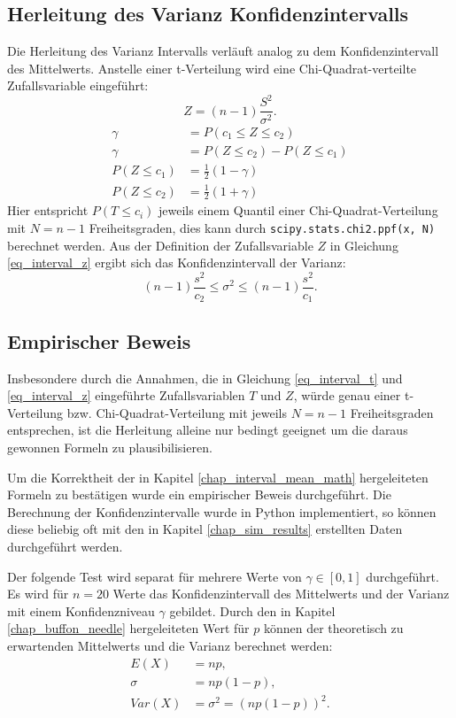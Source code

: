 \documentclass[10pt,twocolumn]{scrartcl}
\begin{document}
	\subsection{Herleitung des Varianz Konfidenzintervalls}
		\label{chap_interval_var_math}
		Die Herleitung des Varianz Intervalls verläuft analog zu dem Konfidenzintervall  des Mittelwerts. Anstelle einer t-Verteilung wird eine Chi-Quadrat-verteilte Zufallsvariable eingeführt:
		\begin{equation} \label{eq_interval_z}
		Z = (n-1)\frac{S^2}{\sigma^2} .
		\end{equation}
		\begin{align}
		\gamma &= P(c_1 \le Z \le c_2) \\
		\gamma &= P(Z \le c_2) - P(Z \le c_1) \nonumber \\
		P(Z \le c_1) &= \frac{1}{2} (1-\gamma) \\
		P(Z \le c_2) &= \frac{1}{2} (1+\gamma)
		\end{align}
		Hier entspricht $P(T \le c_i)$ jeweils einem Quantil einer Chi-Quadrat-Verteilung mit $N = n-1$ Freiheitsgraden, dies kann durch \texttt{scipy.stats.chi2.ppf(x, N)}\cite{scipy} berechnet werden.
		Aus der Definition der Zufallsvariable $Z$ in Gleichung \ref{eq_interval_z} ergibt sich das Konfidenzintervall der Varianz:
		\begin{equation}
		(n-1)  \frac{s^2}{c_2} \le \sigma^2 \le (n-1)  \frac{s^2}{c_1}.
		\end{equation}

	\subsection{Empirischer Beweis}
		\label{chap_interval_prove}
		Insbesondere durch die Annahmen, die in Gleichung \ref{eq_interval_t} und \ref{eq_interval_z} eingeführte  Zufallsvariablen $T$ und $Z$, würde genau einer t-Verteilung bzw. Chi-Quadrat-Verteilung mit jeweils $N = n-1$ Freiheitsgraden entsprechen, ist die Herleitung alleine nur bedingt geeignet um die daraus gewonnen Formeln zu plausibilisieren.

		Um die Korrektheit der in Kapitel \ref{chap_interval_mean_math} hergeleiteten Formeln zu bestätigen wurde ein empirischer Beweis durchgeführt. Die Berechnung der Konfidenzintervalle wurde in Python implementiert, so können diese beliebig oft mit den in Kapitel \ref{chap_sim_results} erstellten Daten durchgeführt werden.

		Der folgende Test wird separat für mehrere Werte von $\gamma \in [0, 1]$ durchgeführt. Es wird für $n = 20$ Werte das Konfidenzintervall des Mittelwerts und der Varianz mit einem Konfidenzniveau $\gamma$ gebildet. Durch den in Kapitel \ref{chap_buffon_needle} hergeleiteten Wert für $p$ können der theoretisch zu erwartenden Mittelwerts und die Varianz berechnet  werden:
		\begin{align}
		E(X) &= n p , \\
		\sigma &= n p (1-p) , \nonumber \\
		Var(X) &= \sigma^2 = (n p (1-p))^2 .
		\end{align}
\end{document}
